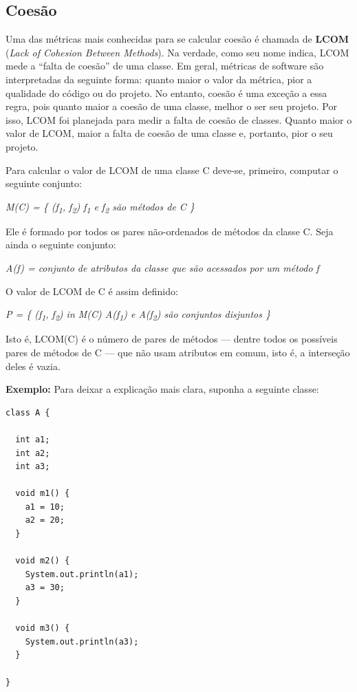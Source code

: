 \documentclass[
  11pt,
  twoside]{book}
\begin{document}
\hypertarget{coesuxe3o-1}{%
\subsection{Coesão}\label{coesuxe3o-1}}


Uma das métricas mais conhecidas para se calcular coesão é chamada de
\textbf{LCOM} (\emph{Lack of Cohesion Between Methods}). Na verdade,
como seu nome indica, LCOM mede a ``falta de coesão'' de uma classe. Em
geral, métricas de software são interpretadas da seguinte forma: quanto
maior o valor da métrica, pior a qualidade do código ou do projeto. No
entanto, coesão é uma exceção a essa regra, pois quanto maior a coesão
de uma classe, melhor o ser seu projeto. Por isso, LCOM foi planejada
para medir a falta de coesão de classes. Quanto maior o valor de LCOM,
maior a falta de coesão de uma classe e, portanto, pior o seu projeto.

Para calcular o valor de LCOM de uma classe C deve-se, primeiro,
computar o seguinte conjunto:

\emph{M(C) = \{ (f\textsubscript{1}, f\textsubscript{2}) \textbar{}
f\textsubscript{1} e f\textsubscript{2} são métodos de C \}}

Ele é formado por todos os pares não-ordenados de métodos da classe C.
Seja ainda o seguinte conjunto:

\emph{A(f) = conjunto de atributos da classe que são acessados por um
método f}

O valor de LCOM de C é assim definido:

\emph{P = \textbar{} \{ (f\textsubscript{1}, f\textsubscript{2}) in M(C)
\textbar{} A(f\textsubscript{1}) e A(f\textsubscript{2}) são conjuntos
disjuntos \} \textbar{}}

Isto é, LCOM(C) é o número de pares de métodos --- dentre todos os
possíveis pares de métodos de C --- que não usam atributos em comum,
isto é, a interseção deles é vazia.

\textbf{Exemplo:} Para deixar a explicação mais clara, suponha a
seguinte classe:

\begin{lstlisting}
class A {

  int a1;
  int a2;
  int a3;

  void m1() {
    a1 = 10;
    a2 = 20;
  }

  void m2() {
    System.out.println(a1);
    a3 = 30;
  }

  void m3() {
    System.out.println(a3);
  }

}
\end{lstlisting}
\end{document}
